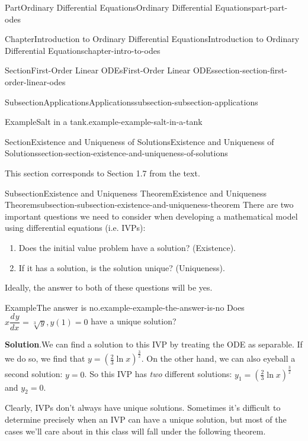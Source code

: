 \documentclass[twoside,10pt,]{book}
\newcommand{\blocktitlefont}{\relax}
\numberwithin{equation}{part}
\newcommand{\dv}[3][]{\dfrac{d^{#1} #2}{d #3^{#1}}}
\begin{document}
\begin{partptx}{Part}{Ordinary Differential Equations}{}{Ordinary Differential Equations}{}{}{part-part-odes}
\begin{chapterptx}{Chapter}{Introduction to Ordinary Differential Equations}{}{Introduction to Ordinary Differential Equations}{}{}{chapter-intro-to-odes}
\begin{sectionptx}{Section}{First-Order Linear ODEs}{}{First-Order Linear ODEs}{}{}{section-section-first-order-linear-odes}
\begin{subsectionptx}{Subsection}{Applications}{}{Applications}{}{}{subsection-subsection-applications}
\begin{example}{Example}{Salt in a tank.}{example-example-salt-in-a-tank}
\end{example}
\end{subsectionptx}
\end{sectionptx}
%
%
\typeout{************************************************}
\typeout{************************************************}
%
\begin{sectionptx}{Section}{Existence and Uniqueness of Solutions}{}{Existence and Uniqueness of Solutions}{}{}{section-section-existence-and-uniqueness-of-solutions}
\begin{introduction}{}%
This section corresponds to Section 1.7 from the text.%
\end{introduction}%
%
%
\typeout{************************************************}
\typeout{************************************************}
%
\begin{subsectionptx}{Subsection}{Existence and Uniqueness Theorem}{}{Existence and Uniqueness Theorem}{}{}{subsection-subsection-existence-and-uniqueness-theorem}
There are two important questions we need to consider when developing a mathematical model using differential equations (i.e. IVPs):%
\begin{enumerate}
\item{}Does the initial value problem have a solution? (Existence).%
\item{}If it has a solution, is the solution unique? (Uniqueness).%
\end{enumerate}
Ideally, the answer to both of these questions will be yes.%
\begin{example}{Example}{The answer is no.}{example-example-the-answer-is-no}%
Does \(x\dv{y}{x} = \sqrt[3]{y},y(1) = 0\) have a unique solution?%
\par\smallskip%
\noindent\textbf{\blocktitlefont Solution}.\hypertarget{solution-example-the-answer-is-no-c}{}\quad{}We can find a solution to this IVP by treating the ODE as separable. If we do so, we find that \(y = \left(\frac{2}{3}\ln x\right)^{\frac{3}{2}}\). On the other hand, we can also eyeball a second solution: \(y=0\). So this IVP has \emph{two} different solutions: \(y_{1} = \left(\frac{2}{3}\ln x\right)^{\frac{3}{2}}\) and \(y_{2} = 0\).%
\end{example}
Clearly, IVPs don't always have unique solutions. Sometimes it's difficult to determine precisely when an IVP can have a unique solution, but most of the cases we'll care about in this class will fall under the following theorem.%

\end{subsectionptx}
\end{sectionptx}
\end{chapterptx}
\end{partptx}
\end{document}

